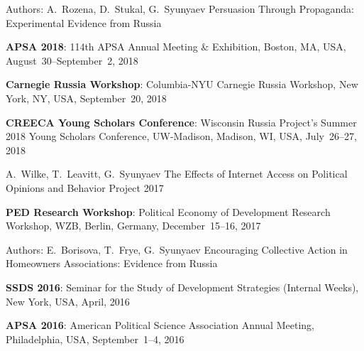 

\begin{cventries}

  \cventry
    {Authors: A.~Rozena, D.~Stukal, G.~Syunyaev} %
    {Persuasion Through Propaganda: Experimental Evidence from Russia} %
    {} %
    {} %
    {
      \begin{cvitems} %
        \item {\textbf{APSA 2018}: 114th APSA Annual Meeting \& Exhibition, Boston, MA, USA, August~30--September~2, 2018}
        \item {\textbf{Carnegie Russia Workshop}: Columbia-NYU Carnegie Russia Workshop, New York, NY, USA, September~20, 2018}
        \item {\textbf{CREECA Young Scholars Conference}: Wisconsin Russia Project's Summer 2018 Young Scholars Conference, UW-Madison, Madison, WI, USA, July~26--27, 2018}
      \end{cvitems}
    }

  \cventry
    {A.~Wilke, T.~Leavitt, G.~Syunyaev} %
    {The Effects of Internet Access on Political Opinions and Behavior} %
    {Project} %
    {2017} %
    {
        \begin{cvitems} %
          \item {\textbf{PED Research Workshop}: Political Economy of Development Research Workshop, WZB, Berlin, Germany, December~15--16, 2017}
        \end{cvitems}
    }

  \cventry
    {Authors: E.~Borisova, T.~Frye, G.~Syunyaev} %
    {Encouraging Collective Action in Homeowners Associations: Evidence from Russia} %
    {} %
    {} %
    {
      \begin{cvitems} %
        \item {\textbf{SSDS 2016}: Seminar for the Study of Development Strategies (Internal Weeks), New York, USA, April, 2016}
        \item {\textbf{APSA 2016}: American Political Science Association Annual Meeting, Philadelphia, USA, September~1--4, 2016}
      \end{cvitems}
    }


\end{cventries}
